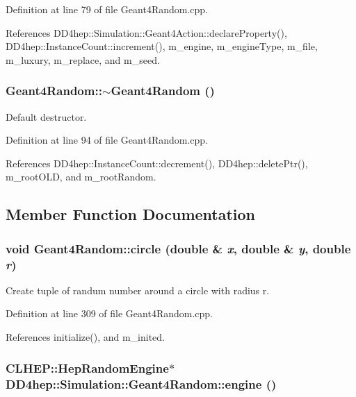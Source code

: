 Definition at line 79 of file Geant4Random.cpp.

References DD4hep::Simulation::Geant4Action::declareProperty(), DD4hep::InstanceCount::increment(), m\_\-engine, m\_\-engineType, m\_\-file, m\_\-luxury, m\_\-replace, and m\_\-seed.\hypertarget{class_d_d4hep_1_1_simulation_1_1_geant4_random_a36518f1890fdb6177b2296b5f905fb07}{
\subsubsection[{$\sim$Geant4Random}]{\setlength{\rightskip}{0pt plus 5cm}Geant4Random::$\sim$Geant4Random ()}}
\label{class_d_d4hep_1_1_simulation_1_1_geant4_random_a36518f1890fdb6177b2296b5f905fb07}


Default destructor. 

Definition at line 94 of file Geant4Random.cpp.

References DD4hep::InstanceCount::decrement(), DD4hep::deletePtr(), m\_\-rootOLD, and m\_\-rootRandom.

\subsection{Member Function Documentation}
\hypertarget{class_d_d4hep_1_1_simulation_1_1_geant4_random_a1319236bb57ff830f1d575dbe928cb01}{
\subsubsection[{circle}]{\setlength{\rightskip}{0pt plus 5cm}void Geant4Random::circle (double \& {\em x}, \/  double \& {\em y}, \/  double {\em r})}}
\label{class_d_d4hep_1_1_simulation_1_1_geant4_random_a1319236bb57ff830f1d575dbe928cb01}


Create tuple of randum number around a circle with radius r. 

Definition at line 309 of file Geant4Random.cpp.

References initialize(), and m\_\-inited.\hypertarget{class_d_d4hep_1_1_simulation_1_1_geant4_random_a80dcc27ca6d3ddc4a99f6f3b9d0d4465}{
\subsubsection[{engine}]{\setlength{\rightskip}{0pt plus 5cm}CLHEP::HepRandomEngine$\ast$ DD4hep::Simulation::Geant4Random::engine ()}}
\label{class_d_d4hep_1_1_simulation_1_1_geant4_random_a80dcc27ca6d3ddc4a99f6f3b9d0d4465}


